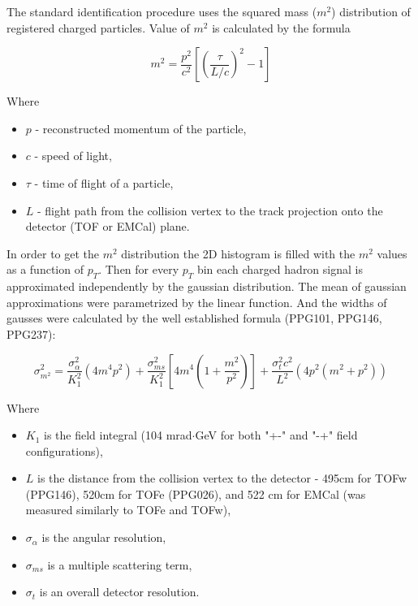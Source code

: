 The standard identification procedure uses the squared mass ($m^2$) distribution of registered charged particles. Value of $m^2$ is calculated by the formula

\begin{equation}
	m^2 = \frac{p^2}{c^2} \left[ \left( \frac{\tau}{L/c} \right)^2 - 1 \right]
\end{equation}

Where

\begin{itemize}
	\item $p$ - reconstructed momentum of the particle,
	\item $c$ - speed of light,
	\item $\tau$ - time of flight of a particle,
	\item $L$ - flight path from the collision vertex to the track projection onto the detector (TOF or EMCal) plane.
\end{itemize}

In order to get the $m^2$ distribution the 2D histogram is filled with the $m^2$ values as a function of $p_T$. Then for every $p_T$ bin each charged hadron signal is approximated independently by the gaussian distribution. The mean of gaussian approximations were parametrized by the linear function. And the widths of gausses were calculated by the well established formula (PPG101, PPG146, PPG237):

\begin{equation}
	\sigma^2_{m^2} = \frac{\sigma_{\alpha}^2}{K_1^2} \left(4m^4 p^2 \right) + \frac{\sigma_{ms}^2}{K_1^2} \left[ 4m^4 \left( 1+\frac{m^2}{p^2} \right) \right] + \frac{\sigma_t^2 c^2}{L^2} \left( 4p^2(m^2+p^2) \right)
\end{equation}

Where
\begin{itemize}
	\item $K_1$ is the field integral (104 mrad$\cdot$GeV for both "+-" and "-+" field configurations),
	\item $L$ is the distance from the collision vertex to the detector - 495cm for TOFw (PPG146), 520cm for TOFe (PPG026), and 522 cm for EMCal (was measured similarly to TOFe and TOFw), 
	\item $\sigma_{\alpha}$ is the angular resolution,
	\item $\sigma_{ms}$ is a multiple scattering term,
	\item $\sigma_t$ is an overall detector resolution.
\end{itemize}

